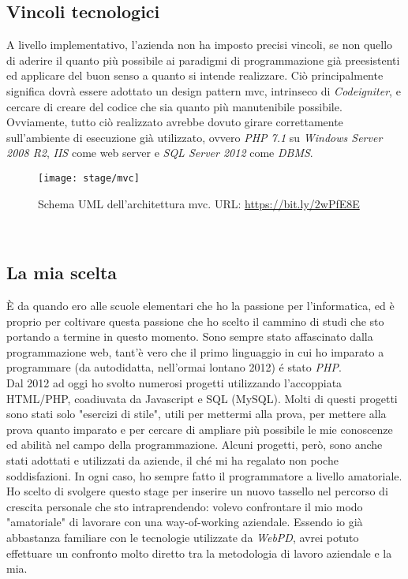 \subsection{Vincoli tecnologici}
A livello implementativo, l'azienda non ha imposto precisi vincoli, se non quello di aderire il quanto più possibile ai paradigmi di programmazione già preesistenti ed applicare del buon senso a quanto si intende realizzare. Ciò principalmente significa dovrà essere adottato un design pattern \gls{mvc}, intrinseco di \textit{Codeigniter}, e cercare di creare del codice che 
sia quanto più manutenibile possibile. Ovviamente, tutto ciò realizzato avrebbe dovuto girare correttamente sull'ambiente di esecuzione già utilizzato, ovvero \textit{PHP 7.1} su \textit{Windows Server 2008 R2}, \textit{IIS} come web server e \textit{SQL Server 2012} come \textit{\gls{DBMS}}.
\begin{figure}[!h] 
	\centering 
	\texttt{[image: stage/mvc]} 
	\caption{Schema UML dell'architettura \gls{mvc}. URL: \url{https://bit.ly/2wPfE8E} }
\end{figure}\\

\subsection{La mia scelta}
È da quando ero alle scuole elementari che ho la passione per l'informatica, ed è proprio per coltivare questa passione che ho scelto il cammino di studi che sto portando a termine in questo momento. Sono sempre stato affascinato dalla programmazione web, tant'è vero che il primo linguaggio in cui ho imparato a programmare (da autodidatta, nell'ormai lontano 2012) é stato \textit{PHP}.\\
Dal 2012 ad oggi ho svolto numerosi progetti utilizzando l'accoppiata HTML/PHP, coadiuvata da Javascript e SQL (MySQL). Molti di questi progetti sono stati solo "esercizi di stile", utili per mettermi alla prova, per mettere alla prova quanto imparato e per cercare di ampliare più possibile le mie conoscenze ed abilità nel campo della programmazione. Alcuni progetti, però, sono anche stati adottati e utilizzati da aziende, il ché mi ha regalato non poche soddisfazioni. In ogni caso, ho sempre fatto il programmatore a livello amatoriale.\\
Ho scelto di svolgere questo stage per inserire un nuovo tassello nel percorso di crescita personale che sto intraprendendo: volevo confrontare il mio modo "amatoriale" di lavorare con una way-of-working aziendale. Essendo io già abbastanza familiare con le tecnologie utilizzate da \textit{WebPD}, avrei potuto effettuare un confronto molto diretto tra la metodologia di lavoro aziendale e la mia. 